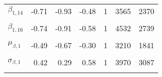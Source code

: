 \begin{table}
\begin{tabular}[t]{lrrrrrr}
$\beta_{1, 14}$ & -0.71 & -0.93 & -0.48 & 1 & 3565 & 2370\\
\cellcolor{gray!6}{$\beta_{1, 15}$} & \cellcolor{gray!6}{-0.06} & \cellcolor{gray!6}{-0.17} & \cellcolor{gray!6}{0.00} & \cellcolor{gray!6}{1} & \cellcolor{gray!6}{3194} & \cellcolor{gray!6}{2367}\\
$\beta_{1, 16}$ & -0.74 & -0.91 & -0.58 & 1 & 4532 & 2739\\
\cellcolor{gray!6}{$\mu_{\beta, 0}$} & \cellcolor{gray!6}{0.98} & \cellcolor{gray!6}{0.92} & \cellcolor{gray!6}{1.04} & \cellcolor{gray!6}{1} & \cellcolor{gray!6}{3572} & \cellcolor{gray!6}{2820}\\
$\mu_{\beta, 1}$ & -0.49 & -0.67 & -0.30 & 1 & 3210 & 1841\\
\cellcolor{gray!6}{$\sigma_{\beta, 0}$} & \cellcolor{gray!6}{0.12} & \cellcolor{gray!6}{0.08} & \cellcolor{gray!6}{0.18} & \cellcolor{gray!6}{1} & \cellcolor{gray!6}{2221} & \cellcolor{gray!6}{2350}\\
$\sigma_{\beta, 1}$ & 0.42 & 0.29 & 0.58 & 1 & 3970 & 3087\\
\cellcolor{gray!6}{$\sigma_{y}$} & \cellcolor{gray!6}{0.12} & \cellcolor{gray!6}{0.10} & \cellcolor{gray!6}{0.14} & \cellcolor{gray!6}{1} & \cellcolor{gray!6}{3751} & \cellcolor{gray!6}{2960}\\
\bottomrule
\end{tabular}
\end{table}